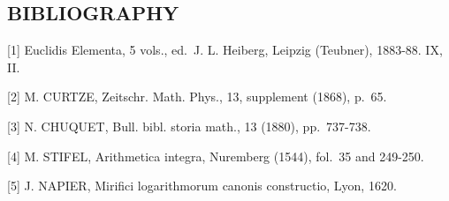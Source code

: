 \subsection*{BIBLIOGRAPHY}

{[}1{]} Euclidis Elementa, 5 vols., ed.~J. L. Heiberg, Leipzig (Teubner), 1883-88. IX, II.

{[}2{]} M. CURTZE, Zeitschr. Math. Phys., 13, supplement (1868), p.~65.

{[}3{]} N. CHUQUET, Bull. bibl. storia math., 13 (1880), pp.~737-738.

{[}4{]} M. STIFEL, Arithmetica integra, Nuremberg (1544), fol.~35 and 249-250.

{[}5{]} J. NAPIER, Mirifici logarithmorum canonis constructio, Lyon, 1620.

